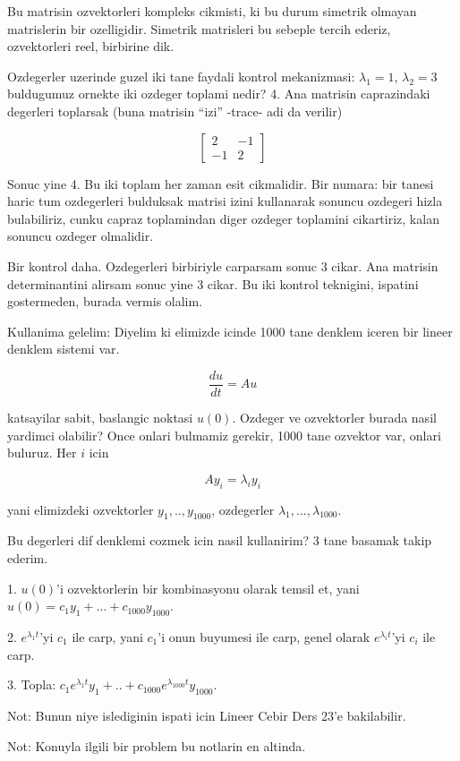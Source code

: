 \documentclass[12pt,fleqn]{article}\usepackage{../common}
\begin{document}
Bu matrisin ozvektorleri kompleks cikmisti, ki bu durum simetrik olmayan
matrislerin bir ozelligidir. Simetrik matrisleri bu sebeple tercih ederiz,
ozvektorleri reel, birbirine dik.

Ozdegerler uzerinde guzel iki tane faydali kontrol mekanizmasi: $\lambda_1
= 1$, 
$\lambda_2 = 3$ buldugumuz ornekte iki ozdeger toplami nedir? 4. Ana
matrisin caprazindaki degerleri toplarsak (buna matrisin ``izi'' -trace-
adi da verilir)

\[ 
\left[\begin{array}{rr}
2 & -1 \\
-1 & 2
\end{array}\right]
 \]

Sonuc yine 4. Bu iki toplam her zaman esit cikmalidir. Bir numara: bir
tanesi haric tum ozdegerleri bulduksak matrisi izini kullanarak sonuncu
ozdegeri hizla bulabiliriz, cunku capraz toplamindan diger ozdeger
toplamini cikartiriz, kalan sonuncu ozdeger olmalidir.

Bir kontrol daha. Ozdegerleri birbiriyle carparsam sonuc 3 cikar. Ana
matrisin determinantini alirsam sonuc yine 3 cikar. Bu iki kontrol
teknigini, ispatini gostermeden, burada vermis olalim. 

Kullanima gelelim: Diyelim ki elimizde icinde 1000 tane denklem iceren bir
lineer denklem sistemi var. 

\[ \frac{du}{dt} = Au \]

katsayilar sabit, baslangic noktasi $u(0)$. Ozdeger ve ozvektorler burada
nasil yardimci olabilir? Once onlari bulmamiz gerekir, 1000 tane ozvektor
var, onlari buluruz. Her $i$ icin 

\[ Ay_i = \lambda_i y_i \]

yani elimizdeki ozvektorler $y_1,..,y_{1000}$, ozdegerler
$\lambda_1,...,\lambda_{1000}$. 

Bu degerleri dif denklemi cozmek icin nasil kullanirim? 3 tane basamak
takip ederim. 

1. $u(0)$'i ozvektorlerin bir kombinasyonu olarak temsil et, yani
 $u(0) =
c_1y_1 + ... + c_{1000}y_{1000}$. 

2. $e^{\lambda_1t}$'yi $c_1$ ile carp, yani $c_1$'i onun buyumesi ile
carp, genel olarak $e^{\lambda_it}$'yi $c_i$ ile carp. 

3. Topla: $c_1e^{\lambda_1t}y_1 + .. + c_{1000}e^{\lambda_{1000}
  t}y_{1000}$. 

Not: Bunun niye islediginin ispati icin Lineer Cebir Ders 23'e bakilabilir.

Not: Konuyla ilgili bir problem bu notlarin en altinda.
\end{document}
